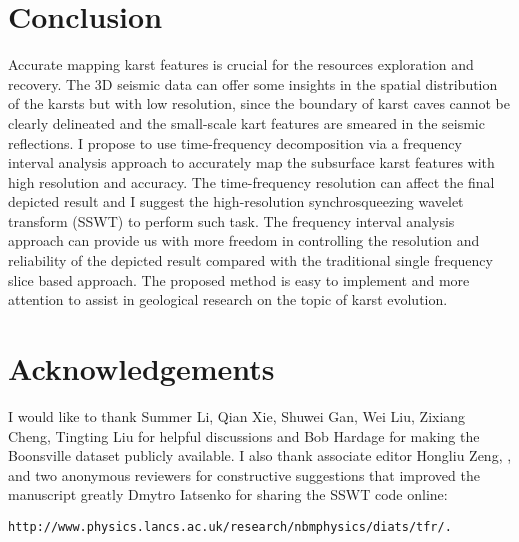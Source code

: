  
\section{Conclusion}
Accurate mapping  karst features is crucial for the resources exploration and recovery. The 3D seismic data can offer some insights in the spatial distribution of the karsts\new{,} but with low resolution, since the boundary of karst caves cannot be clearly delineated and the small-scale kart features are smeared in the seismic reflections. I propose to use time-frequency decomposition via a frequency interval analysis approach to accurately map the subsurface karst features with high resolution and accuracy. The time-frequency resolution can affect the final depicted result\new{,} and I suggest  the high-resolution synchrosqueezing wavelet transform (SSWT) to perform such task. The frequency interval analysis approach can provide us with more freedom in controlling the resolution and reliability of the  depicted result\new{,} compared with the traditional single frequency slice based approach. The proposed method is easy to implement and  more attention to assist in geological research on the topic of karst evolution.


\section{Acknowledgements}
I would like to thank Summer Li, Qian Xie, Shuwei Gan, Wei Liu, Zixiang Cheng, Tingting Liu for helpful discussions\new{,} and Bob Hardage for making the Boonsville dataset publicly available.  I also thank associate editor Hongliu Zeng, , and two anonymous reviewers for constructive suggestions that improved the manuscript greatly Dmytro Iatsenko for sharing the SSWT code online: 
\begin{verbatim}
http://www.physics.lancs.ac.uk/research/nbmphysics/diats/tfr/.
\end{verbatim}
\newpage










